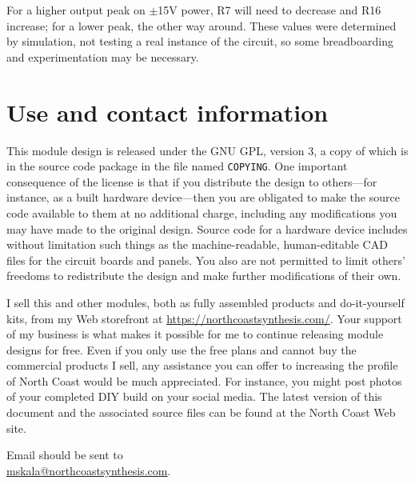 For a higher output peak on $\pm$15V power, R7 will need to decrease and R16
increase; for a lower peak, the other way around.  These values were
determined by simulation, not testing a real instance of the circuit, so
some breadboarding and experimentation may be necessary.

\section{Use and contact information}

This module design is released under the GNU GPL, version 3, a copy of which
is in the source code package in the file named \texttt{COPYING}.  One
important consequence of the license is that if you distribute the design to
others---for instance, as a built hardware device---then you are obligated
to make the source code available to them at no additional charge, including
any modifications you may have made to the original design.  Source code for
a hardware device includes without limitation such things as the
machine-readable, human-editable CAD files for the circuit boards and
panels.  You also are not permitted to limit others' freedoms to
redistribute the design and make further modifications of their own.

I sell this and other modules, both as fully assembled products and
do-it-yourself kits, from my Web storefront at
\url{https://northcoastsynthesis.com/}.  Your support of my business is what
makes it possible for me to continue releasing module designs for free. 
Even if you only use the free plans and cannot buy the commercial products I
sell, any assistance you can offer to increasing the profile of North Coast
would be much appreciated.  For instance, you might post photos of your
completed DIY build on your social media.  The latest version of this
document and the associated source files can be found at the North Coast Web
site.

Email should be sent to\\ \url{mskala@northcoastsynthesis.com}.
